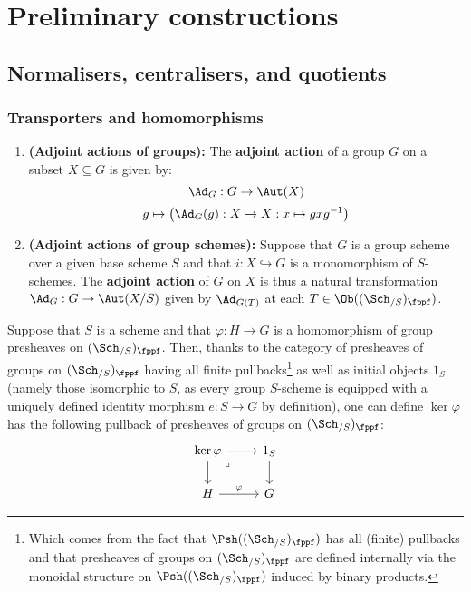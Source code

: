 \section{Preliminary constructions}
    \subsection{Normalisers, centralisers, and quotients}
        \subsubsection{Transporters and homomorphisms}
            \begin{definition} \label{def: adjoint_actions}
                \noindent
                \begin{enumerate}
                    \item \textbf{(Adjoint actions of groups):} The \textbf{adjoint action} of a group $G$ on a subset $X \subseteq G$ is given by:
                        $$\Ad_G: G \to \Aut(X)$$
                        $$g \mapsto \left(\Ad_G(g): X \to X: x \mapsto gxg^{-1}\right)$$
                    \item \textbf{(Adjoint actions of group schemes):} Suppose that $G$ is a group scheme over a given base scheme $S$ and that $i: X \hookrightarrow G$ is a monomorphism of $S$-schemes. The \textbf{adjoint action} of $G$ on $X$ is thus a natural transformation $\Ad_G: G \to \Aut(X/S)$ given by $\Ad_{G(T)}$ at each $T \in \Ob((\Sch_{/S})_{\fppf})$.
                \end{enumerate}
            \end{definition}
            \begin{definition}[Kernels] \label{def: kernels_of_homomorphisms_of_group_schemes}
                Suppose that $S$ is a scheme and that $\varphi: H \to G$ is a homomorphism of group presheaves on $(\Sch_{/S})_{\fppf}$. Then, thanks to the category of presheaves of groups on $(\Sch_{/S})_{\fppf}$ having all finite pullbacks\footnote{Which comes from the fact that $\Psh((\Sch_{/S})_{\fppf})$ has all (finite) pullbacks and that presheaves of groups on $(\Sch_{/S})_{\fppf}$ are defined internally via the monoidal structure on $\Psh((\Sch_{/S})_{\fppf})$ induced by binary products.} as well as initial objects $1_S$ (namely those isomorphic to $S$, as every group $S$-scheme is equipped with a uniquely defined identity morphism $e: S \to G$ by definition), one can define $\ker \varphi$ has the following pullback of presheaves of groups on $(\Sch_{/S})_{\fppf}$:
                    $$
                        \begin{tikzcd}
                        	{\ker \varphi} & {1_S} \\
                        	H & G
                        	\arrow[from=1-2, to=2-2]
                        	\arrow["\varphi", from=2-1, to=2-2]
                        	\arrow[from=1-1, to=2-1]
                        	\arrow[from=1-1, to=1-2]
                        	\arrow["\lrcorner"{anchor=center, pos=0.125}, draw=none, from=1-1, to=2-2]
                        \end{tikzcd}
                    $$
            \end{definition}
